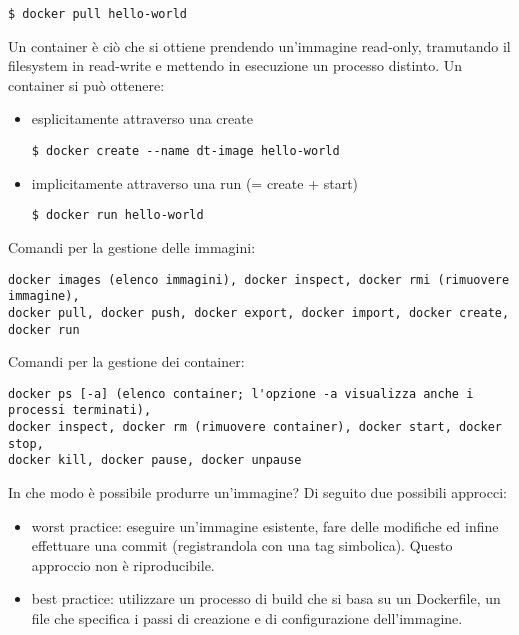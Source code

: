 \begin{verbatim}
$ docker pull hello-world
\end{verbatim}

\noindent Un container è ciò che si ottiene prendendo un'immagine read-only, tramutando il filesystem in read-write e mettendo in esecuzione un processo distinto. Un container si può ottenere:
\begin{itemize}
    \item esplicitamente attraverso una create
\begin{verbatim}
$ docker create --name dt-image hello-world
\end{verbatim}
    \item implicitamente attraverso una run (= create + start)
\begin{verbatim}
$ docker run hello-world
\end{verbatim}
\end{itemize}

\noindent Comandi per la gestione delle immagini: 
\begin{verbatim}
docker images (elenco immagini), docker inspect, docker rmi (rimuovere immagine),
docker pull, docker push, docker export, docker import, docker create, docker run
\end{verbatim}

\noindent Comandi per la gestione dei container:
\begin{verbatim}
docker ps [-a] (elenco container; l'opzione -a visualizza anche i processi terminati),
docker inspect, docker rm (rimuovere container), docker start, docker stop,
docker kill, docker pause, docker unpause
\end{verbatim}

\noindent In che modo è possibile produrre un'immagine? Di seguito due possibili approcci:

\begin{itemize}
    \item worst practice: eseguire un'immagine esistente, fare delle modifiche ed infine effettuare una commit (registrandola con una tag simbolica). Questo approccio non è riproducibile.
    \item best practice: utilizzare un processo di build che si basa su un Dockerfile, un file che specifica i passi di creazione e di configurazione dell'immagine.
\end{itemize}

